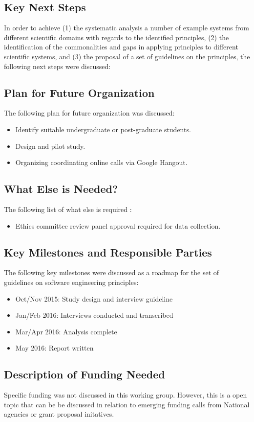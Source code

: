 \subsection{Key Next Steps}
In order to achieve (1) the systematic analysis a number of example systems from different scientific domains with regards to the identified principles, (2) the identification of the commonalities and gaps in applying principles to different scientific systems, and (3) the proposal of a set of guidelines on the principles, the following next steps were discussed:

\subsection{Plan for Future Organization}
The following plan for future organization was discussed:
\begin{itemize}
\item Identify suitable undergraduate or post-graduate students.
\item Design and pilot study.
\item Organizing coordinating online calls via Google Hangout.
\end{itemize}

\subsection{What Else is Needed?}
The following list of what else is required :
\begin{itemize}
\item Ethics committee review panel approval required for data collection.
\end{itemize}

\subsection{Key Milestones and Responsible Parties}
The following key milestones were discussed as a roadmap for the set of guidelines on software engineering principles:
\begin{itemize}
\item Oct/Nov 2015: Study design and interview guideline
\item Jan/Feb 2016: Interviews conducted and transcribed
\item Mar/Apr 2016: Analysis complete
\item May 2016: Report written
\end{itemize}

\subsection{Description of Funding Needed}
Specific funding was not discussed in this working group. However, this is a open topic that can be be discussed in relation to emerging funding calls from National agencies or grant proposal initatives.
